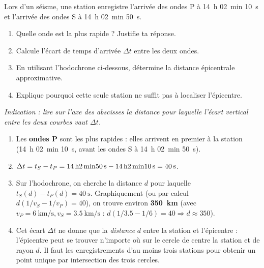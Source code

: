 \documentclass[11pt]{article}
\begin{document}
\begin{exercice}
Lors d'un séisme, une station enregistre l'arrivée des ondes P à \SI{14}{\hour} \SI{02}{\minute} \SI{10}{\second} et l'arrivée des ondes S à \SI{14}{\hour} \SI{02}{\minute} \SI{50}{\second}.
\begin{enumerate}
\item Quelle onde est la plus rapide ? Justifie ta réponse.
\item Calcule l'écart de temps d'arrivée $\Delta t$ entre les deux ondes.
\item En utilisant l'hodochrone ci-dessous, détermine la distance épicentrale approximative.
\item Explique pourquoi cette seule station ne suffit pas à localiser l'épicentre.
\end{enumerate}

\begin{center}
\end{center}
\emph{Indication : lire sur l'axe des abscisses la distance pour laquelle l'écart vertical entre les deux courbes vaut $\Delta t$.}
\end{exercice}

\begin{corrige}[Exercice]
\begin{enumerate}
\item Les \textbf{ondes P} sont les plus rapides : elles arrivent en premier à la station (\SI{14}{\hour} \SI{02}{\minute} \SI{10}{\second}, avant les ondes S à \SI{14}{\hour} \SI{02}{\minute} \SI{50}{\second}).
\item $\Delta t = t_S - t_P = \SI{14}{\hour} \SI{02}{\minute} \SI{50}{\second} - \SI{14}{\hour} \SI{02}{\minute} \SI{10}{\second} = \textbf{\SI{40}{\second}}$.
\item Sur l'hodochrone, on cherche la distance $d$ pour laquelle $t_S(d) - t_P(d) = \SI{40}{\second}$. Graphiquement (ou par calcul $d(1/v_S - 1/v_P) = 40$), on trouve environ \textbf{\SI{350}{\kilo\meter}} (avec $v_P=\SI{6}{\kilo\meter/\second}, v_S=\SI{3.5}{\kilo\meter/\second}$ : $d(1/3.5 - 1/6) = 40 \Rightarrow d \approx 350$).
\item Cet écart $\Delta t$ ne donne que la \emph{distance} $d$ entre la station et l'épicentre : l'épicentre peut se trouver n'importe où sur le cercle de centre la station et de rayon $d$. Il faut les enregistrements d'au moins trois stations pour obtenir un point unique par intersection des trois cercles.
\end{enumerate}
\end{corrige}
\end{document}
